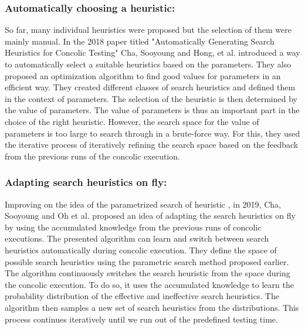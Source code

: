 \documentclass[ runningheads,
               a4paper]{llncs}
\begin{document}
\subsubsection{Automatically choosing a heuristic:}
So far, many individual heuristics were proposed but the selection of them were mainly manual. In the 2018 paper titled "Automatically Generating Search Heuristics for Concolic Testing" \cite{cha2018automatically} Cha, Sooyoung and Hong, et al. introduced a way to automatically select a suitable heuristics based on the parameters. They also proposed an optimization algorithm to find good values for parameters in an efficient way. They created different classes of search heuristics and defined them in the context of parameters. The selection of the heuristic is then determined by the value of parameters. The value of parameters is thus an important part in the choice of the right heuristic. However, the search space for the value of parameters is too large to search through in a brute-force way. For this, they used the iterative process of iteratively refining the search space based on the feedback from the previous runs of the concolic execution.


\subsubsection{Adapting search heuristics on fly:}
Improving on the idea of the parametrized search of heuristic \cite{cha2018automatically}, in 2019, Cha, Sooyoung and Oh et al. proposed an idea \cite{adapt2019heuristic} of adapting the search heuristics on fly by using the accumulated knowledge from the previous runs of concolic executions. The presented algorithm can learn and switch between search heuristics automatically during concolic execution. They define the space of possible search heuristics using the parametric search method \cite{adapt2019heuristic} proposed earlier. The algorithm continuously switches the search heuristic from the space during the concolic execution. To do so, it uses the accumulated knowledge to learn the probability distribution of the effective and ineffective search heuristics. The algorithm then samples a new set of search heuristics from the distributions. This process continues iteratively until we run out of the predefined testing time.
\end{document}
